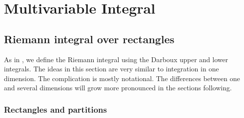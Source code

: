 \chapter{Multivariable Integral} \label{mi:chapter}



\section{Riemann integral over rectangles}
\label{sec:rirect}



As in , we define the Riemann integral using the Darboux
upper and lower integrals.  The ideas in this section are very similar to
integration in one dimension.  The complication is mostly notational.
The differences between one and several dimensions will grow more pronounced
in the sections following.

\subsection{Rectangles and partitions}

